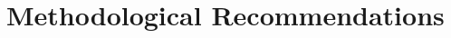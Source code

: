 

\newpage
\section{Methodological Recommendations}
\label{discussion:methodological-discussion}
%
%


